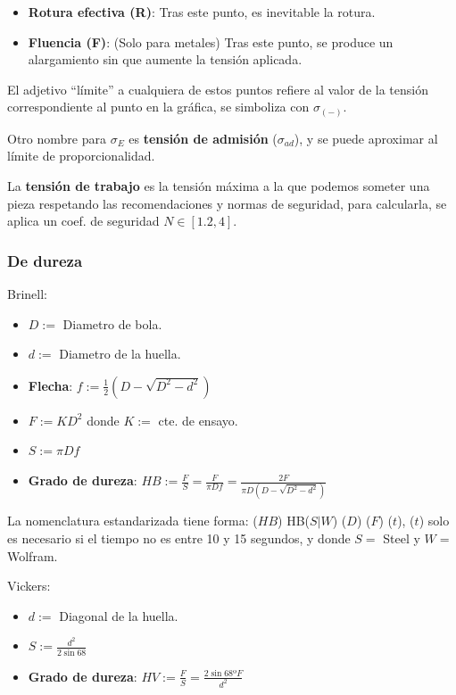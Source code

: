 \documentclass[10pt]{article}
\begin{document}
\begin{itemize}
  \item \textbf{Rotura efectiva (R)}: Tras este punto, es inevitable la rotura.
  \item \textbf{Fluencia (F)}: (Solo para metales) Tras este punto, se produce un alargamiento sin que aumente la tensión aplicada.
\end{itemize}

El adjetivo ``límite'' a cualquiera de estos puntos refiere al valor de la tensión correspondiente al punto en la gráfica, se simboliza con $ \sigma _{(-)} $.

Otro nombre para $ \sigma_{E} $ es \textbf{tensión de admisión} ($ \sigma_{ad} $), y se puede aproximar al límite de proporcionalidad.

La \textbf{tensión de trabajo} es la tensión máxima a la que podemos someter una pieza respetando las recomendaciones y normas de seguridad, para calcularla, se aplica un coef. de seguridad $ N \in [1.2, 4] $.

\subsubsection{De dureza}

Brinell:

\begin{itemize}
  \item $ D := $ Diametro de bola.
  \item $ d := $ Diametro de la huella.
  \item  \textbf{Flecha}: $ f := \frac{1}{2} (D - \sqrt{D^2 - d^2}) $
  \item $ F := K D^2 $ donde $ K := $ cte. de ensayo.
  \item $ S := \pi D f $
  \item \textbf{Grado de dureza}: $ HB := \frac{F}{S} = \frac{F}{\pi D f} = \frac{2 F}{\pi D (D - \sqrt{D^2 - d^2})} $
\end{itemize}

La nomenclatura estandarizada tiene forma: ($HB$) HB($S | W$) ($D$) ($F$) ($t$), ($t$) solo es necesario si el tiempo no es entre 10 y 15 segundos, y donde $ S = $ Steel y $ W = $ Wolfram.

Vickers:

\begin{itemize}
  \item $ d := $ Diagonal de la huella.
  \item $ S := \frac{d^2}{2 \sin{68}} $
  \item \textbf{Grado de dureza}: $ HV := \frac{F}{S} = \frac{2 \sin{68º} F}{d^2} $
\end{itemize}
\end{document}
